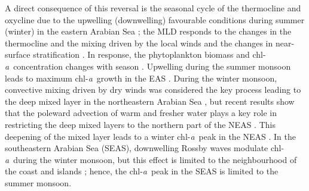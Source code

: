 \documentclass[authoryear,review,11pt]{elsarticle}
\newcommand{\chla}{chl-{\emph{a}}}
\begin{document}
A direct consequence of this reversal is the seasonal cycle of the thermocline \citep{shetye1990hydrography, shetye19911517, vijith2022circulation} and oxycline \citep{desousa1996seasonal, schmidt2020seasonal} due to the upwelling (downwelling) favourable conditions during summer (winter) in the eastern Arabian Sea \citep[EAS;][]{shetye1990hydrography, shetye19911517, vijith2022circulation}; the MLD responds to the changes in the thermocline and the mixing driven by the local winds and the changes in near-surface stratification \citep{shetye19911517, prasad1996mixed, prasannakumara20051848}. In response, the phytoplankton biomass and \chla\ concentration changes with season \citep{subrahmanyan1960studies, banse1968hydrography, prasannakumara20051848, levy2007basin, mccreary2009biophysical, vijith2016consequences, shankar2019role}. Upwelling during the summer monsoon leads to maximum \chla\ growth in the EAS \citep{banse1968hydrography, banse2000geographical, mccreary2009biophysical, hood2017biogeochemical, bemal2018picophytoplankton, shi2022phytoplankton}. During the winter monsoon, convective mixing driven by dry winds was considered the key process leading to the deep mixed layer in the northeastern Arabian Sea \citep[NEAS;][]{banse1968hydrography, shetye1992does, madhupratap1996mechanism, mccreary1996four, levy2007basin}, but recent results show that the poleward advection of warm and fresher water plays a key role in restricting the deep mixed layers to the northern part of the NEAS \citep{shankar2016inhibition}.  This deepening of the mixed layer leads to a winter \chla\ peak in the NEAS \citep{madhupratap1996mechanism, mccreary1996four, levy2007basin, shankar2016inhibition, vijith2016consequences, keerthi2017physical, shi2022phytoplankton}. In the southeastern Arabian Sea (SEAS), downwelling Rossby waves modulate \chla\ during the winter monsoon, but this effect is limited to the neighbourhood of the coast and islands \citep{amol2020modulation}; hence, the \chla\ peak in the SEAS is limited to the summer monsoon. 
\end{document}
